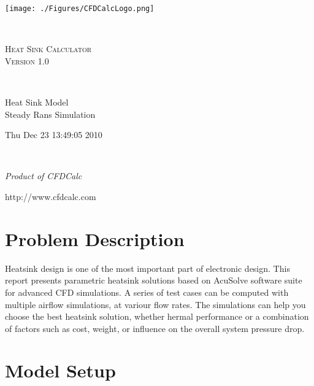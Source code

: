 \documentclass[letterpaper,12pt]{article}
\begin{document}
\begin{center}
\texttt{[image: ./Figures/CFDCalcLogo.png]}
\end{center}
\vspace*{2.00mm}\hspace*{\fill}\\
\begin{center}
\Large{ \textsc{ Heat Sink Calculator\\Version 1.0 }}\\
\end{center}
\vspace*{1.00mm}\hspace*{\fill}\\
\begin{center}
Heat Sink Model\\Steady Rans Simulation\\
\end{center}
\begin{center}
Thu Dec 23 13:49:05 2010\\
\end{center}
\vspace*{1.00mm}\hspace*{\fill}\\
\vfill
\begin{center}
\emph{Product of CFDCalc}\\
\end{center}
\begin{center}
http://www.cfdcalc.com\\
\end{center}
\vfill
\newpage
\clearpage
\tableofcontents
\vfill
\newpage
\clearpage
\section{Problem Description}

Heatsink design is one of the most important part of electronic design.
This report presents parametric heatsink solutions based 
on AcuSolve software suite for advanced CFD simulations. A series of 
test cases can be computed with multiple airflow simulations, at 
variour flow rates. The simulations can help you choose the best 
heatsink solution, whether hermal performance or a combination of 
factors such as cost, weight, or influence on the overall system 
pressure drop.
\\
\section{Model Setup}
\end{document}

